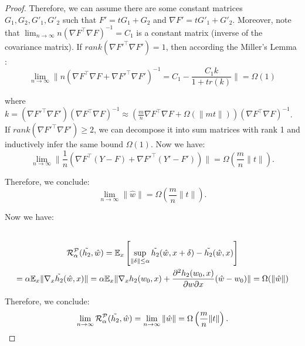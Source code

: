 \begin{proof}
Therefore, we can assume there are some constant matrices $G_1, G_2, G'_1, G'_2$ such that $F' = tG_1 + G_2$ and $\nabla F' = tG'_1 + G'_2$. Moreover, note that $\lim_{n\to\infty} n\left( \nabla F^\top \nabla F \right)^{-1} = C_1$ is a constant matrix (inverse of the covariance matrix). If $rank(\nabla F'^\top \nabla F') = 1$, then according the Miller's Lemma \cite{miller1981inverse}:
\[
\lim_{n\to\infty}\| n\left( \nabla F^\top \nabla F + \nabla F'^\top \nabla F' \right)^{-1} = C_1 - \frac{C_1k}{1 + tr(k)} \| = \Omega(1)
\]

where $k = \left( \nabla F'^\top \nabla F' \right) \left( \nabla F^\top \nabla F \right)^{-1} \approx \left( \frac{m}{n} \nabla F^\top \nabla F + \Omega(\| mt \|) \right) \left( \nabla F^\top \nabla F \right)^{-1}$. If $rank(\nabla F'^\top \nabla F') \geq 2$, we can decompose it into sum matrices with rank 1 and inductively infer the same bound $\Omega(1)$. Now we have:
\[
\lim_{n\to\infty}\| \frac{1}{n} \left( \nabla F^\top (Y - F) + \nabla F'^\top (Y' - F') \right) \| = \Omega(\frac{m}{n} \| t \|).
\]

Therefore, we conclude:
\[
\lim_{n\to\infty} \| \hat{w} \| = \Omega \left(\frac{m}{n} \| t \| \right).
\]

Now we have:
\begin{multline*}
\\
\mathcal{R}^{\mathcal{P}}_{\alpha}(\Tilde{h_2},\hat{w})
= \mathbb{E}_{x} \left[ \sup_{\|\delta\| \leq \alpha} \Tilde{h_2}(\hat{w},x+\delta) - \Tilde{h_2}(\hat{w},x) \right]
\\
= \alpha \mathbb{E}_{x} \| \nabla_x \Tilde{h_2}(\hat{w}, x) \| 
= \alpha \mathbb{E}_{x} \| \nabla_x h_2(w_0, x) + \frac{\partial^2 h_2(w_0, x)}{\partial w \partial x} (\hat{w} - w_0) \| = \Omega(\| \hat{w} \|)
\\
\end{multline*}

Therefore, we conclude:
\[
\lim_{n\to\infty} \mathcal{R}^{\mathcal{P}}_{\alpha}(\Tilde{h_2},\hat{w}) = \lim_{n\to\infty} \| \hat{w} \| = \Omega \left(\frac{m}{n} \| t \| \right).
\]

\end{proof}



